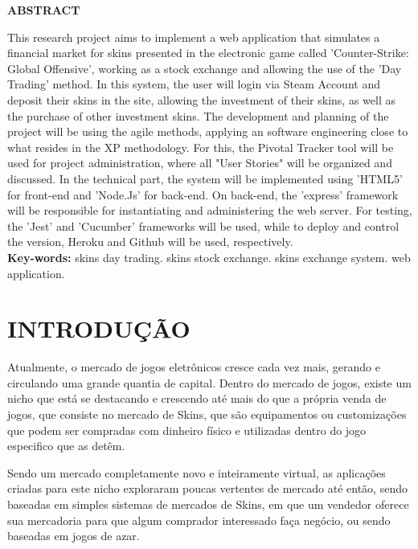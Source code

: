 \documentclass[a4paper, 12pt]{article}
\begin{document}
    \newpage %
    \begin{center}\Large \bf ABSTRACT \end{center}
    \thispagestyle{empty}
    \begin{flushleft}
    This research project aims to implement a web application that simulates a financial market for skins presented in the electronic game called 'Counter-Strike: Global Offensive', working as a stock exchange and allowing the use of the 'Day Trading' method. In this system, the user will login via Steam Account and deposit their skins in the site, allowing the investment of their skins, as well as the purchase of other investment skins. The development and planning of the project will be using the agile methods, applying an software engineering close to what resides in the XP methodology. For this, the Pivotal Tracker tool will be used for project administration, where all "User Stories" will be organized and discussed. In the technical part, the system will be implemented using 'HTML5' for front-end and 'Node.Js' for back-end. On back-end, the 'express' framework will be responsible for instantiating and administering the web server. For testing, the 'Jest' and 'Cucumber' frameworks will be used, while to deploy and control the version, Heroku and Github will be used, respectively. \\
    
    \textbf{Key-words: } skins day trading. skins stock exchange. skins exchange system. web application.
    \end{flushleft}

    \newpage %
    \section{INTRODUÇÃO}
    Atualmente, o mercado de jogos eletrônicos cresce cada vez mais, gerando e circulando uma grande quantia de capital. Dentro do mercado de jogos, existe um nicho que está se destacando e crescendo até mais do que a própria venda de jogos, que consiste no mercado de Skins, que são equipamentos ou customizações que podem ser compradas com dinheiro físico e utilizadas dentro do jogo especifico que as detêm.
    
    Sendo um mercado completamente novo e inteiramente virtual, as aplicações criadas para este nicho exploraram poucas vertentes de mercado até então, sendo baseadas em simples sistemas de mercados de Skins, em que um vendedor oferece sua mercadoria para que algum comprador interessado faça negócio, ou sendo baseadas em jogos de azar.
    
\end{document}
